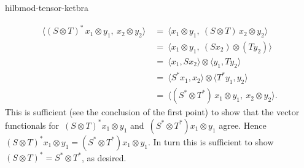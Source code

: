 \begin{solution}{hilbmod-tensor-ketbra}
\begin{enumerate}
\begin{align*}
    \langle (S \otimes T)^* \, x_1 \otimes y_1, \ x_2 \otimes y_2\rangle    
& \ = \  \langle x_1 \otimes y_1, \ (S \otimes T) \, x_2 \otimes y_2\rangle \\
    & \ = \  \langle x_1 \otimes y_1, \ (Sx_2) \otimes (Ty_2) \rangle \\
    & \ = \ \langle x_1, Sx_2\rangle \otimes \langle y_1 , T y_2\rangle\\
    & \ = \ \langle S^* x_1, x_2\rangle \otimes \langle T^* y_1 ,  y_2\rangle\\
    & \ = \  \langle (S^* \otimes T^*)\, x_1 \otimes y_1, \ x_2 \otimes y_2\rangle.
\end{align*}
This is sufficient (see the conclusion of the first point)
        to show that the vector functionals
        for~$(S \otimes T)^* x_1\otimes y_1$
        and~$(S^*\otimes T^*)x_1 \otimes y_1$ agree.
        Hence~$(S \otimes T)^* x_1\otimes y_1= (S^*\otimes T^*)x_1 \otimes y_1$.
        In turn this is sufficient to show~$(S \otimes T)^* = S^* \otimes T^*$,
        as desired.
\end{enumerate}
\end{solution}

